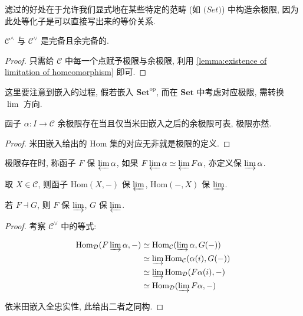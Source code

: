 滤过的好处在于允许我们显式地在某些特定的范畴 (如 \(\mathbf(Set)\)) 中构造余极限, 因为此处等化子是可以直接写出来的等价关系.

\begin{lemma}
    \(\mathcal{C}^{\wedge}\) 与 \(\mathcal{C}^{\vee}\) 是完备且余完备的.

    \begin{proof}
        只需给 \(\mathcal{C}\) 中每一个点赋予极限与余极限, 利用 \ref {lemma:existence of limitation of homeomorphism} 即可.
    \end{proof}
\end{lemma}

这里要注意到嵌入的过程, 假若嵌入 \(\mathbf{Set}^\mathrm{op}\), 而在 \(\mathbf{Set}\) 中考虑对应极限, 需转换 \(\lim\) 方向.

\begin{lemma}
    \label {lemma:existence of limit iff representable}
    函子 \(\alpha : I \to \mathcal{C}\) 余极限存在当且仅当米田嵌入之后的余极限可表, 极限亦然.

    \begin{proof}
        米田嵌入给出的 \(\mathrm{Hom}\) 集的对应无非就是极限的定义.
    \end{proof}
\end{lemma}

\begin{definition}
    极限存在时, 称函子 \(F\) 保 \(\varprojlim \alpha\), 如果 \(F \varprojlim \alpha \simeq \varprojlim F \alpha\), 亦定义保 \(\varinjlim \alpha\).
\end{definition}

\begin{corollary}
    取 \(X \in \mathcal{C}\), 则函子 \(\mathrm{Hom} (X,-)\) 保 \(\varprojlim\), \(\mathrm{Hom} (-,X)\) 保 \(\varinjlim\).
\end{corollary}

\begin{theorem}
    若 \(F \dashv G\), 则 \(F\) 保 \(\varinjlim\), \(G\) 保 \(\varprojlim\).

    \begin{proof}
        考察 \(\mathcal{C}^{\vee}\) 中的等式:

        \[
            \begin{aligned}
                \mathrm{Hom}_{\mathcal{D}} (F \varinjlim \alpha, -) & \simeq \mathrm{Hom}_\mathcal{C} (\varinjlim \alpha, G (-)) \\
                & \simeq \varinjlim \mathrm{Hom}_\mathcal{C} (\alpha (i), G (-)) \\
                & \simeq \varinjlim \mathrm{Hom}_\mathcal{D} (F \alpha (i), -) \\
                & \simeq \mathrm{Hom}_\mathcal{D} (\varinjlim F \alpha, -)
            \end{aligned}
        \]

        依米田嵌入全忠实性, 此给出二者之同构.
    \end{proof}
\end{theorem}
